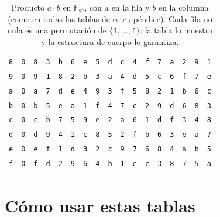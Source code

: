 \documentclass[11pt,a4paper,oneside]{report}
\newcommand{\F}{\mathbb{F}}
\newcommand{\FF}[1]{\F_{2^{#1}}}
\begin{document}
\begin{table}[htbp]
\begin{tabular}{@{}c@{}c@{}c@{}c@{}c@{}c@{}c@{}c@{}c@{}c@{}c@{}c@{}c@{}c@{}c@{}c@{}c@{}}
\texttt{8} & \texttt{0} & \texttt{8} & \texttt{3} & \texttt{b} & \texttt{6} & \texttt{e} & \texttt{5} & \texttt{d} & \texttt{c} & \texttt{4} & \texttt{f} & \texttt{7} & \texttt{a} & \texttt{2} & \texttt{9} & \texttt{1}\\
\texttt{9} & \texttt{0} & \texttt{9} & \texttt{1} & \texttt{8} & \texttt{2} & \texttt{b} & \texttt{3} & \texttt{a} & \texttt{4} & \texttt{d} & \texttt{5} & \texttt{c} & \texttt{6} & \texttt{f} & \texttt{7} & \texttt{e}\\
\texttt{a} & \texttt{0} & \texttt{a} & \texttt{7} & \texttt{d} & \texttt{e} & \texttt{4} & \texttt{9} & \texttt{3} & \texttt{f} & \texttt{5} & \texttt{8} & \texttt{2} & \texttt{1} & \texttt{b} & \texttt{6} & \texttt{c}\\
\texttt{b} & \texttt{0} & \texttt{b} & \texttt{5} & \texttt{e} & \texttt{a} & \texttt{1} & \texttt{f} & \texttt{4} & \texttt{7} & \texttt{c} & \texttt{2} & \texttt{9} & \texttt{d} & \texttt{6} & \texttt{8} & \texttt{3}\\
\texttt{c} & \texttt{0} & \texttt{c} & \texttt{b} & \texttt{7} & \texttt{5} & \texttt{9} & \texttt{e} & \texttt{2} & \texttt{a} & \texttt{6} & \texttt{1} & \texttt{d} & \texttt{f} & \texttt{3} & \texttt{4} & \texttt{8}\\
\texttt{d} & \texttt{0} & \texttt{d} & \texttt{9} & \texttt{4} & \texttt{1} & \texttt{c} & \texttt{8} & \texttt{5} & \texttt{2} & \texttt{f} & \texttt{b} & \texttt{6} & \texttt{3} & \texttt{e} & \texttt{a} & \texttt{7}\\
\texttt{e} & \texttt{0} & \texttt{e} & \texttt{f} & \texttt{1} & \texttt{d} & \texttt{3} & \texttt{2} & \texttt{c} & \texttt{9} & \texttt{7} & \texttt{6} & \texttt{8} & \texttt{4} & \texttt{a} & \texttt{b} & \texttt{5}\\
\texttt{f} & \texttt{0} & \texttt{f} & \texttt{d} & \texttt{2} & \texttt{9} & \texttt{6} & \texttt{4} & \texttt{b} & \texttt{1} & \texttt{e} & \texttt{c} & \texttt{3} & \texttt{8} & \texttt{7} & \texttt{5} & \texttt{a}\\
\bottomrule
\end{tabular}
\caption{Producto $a\cdot b$ en $\FF4$, con $a$ en la fila y $b$ en la
columna (como en todas las tablas de este apéndice). Cada fila no
nula es una permutación de $\{1,\dots,\mathtt{f}\}$: la tabla lo
muestra y la estructura de cuerpo lo garantiza.}
\end{table}

\section{Cómo usar estas tablas}
\end{document}
